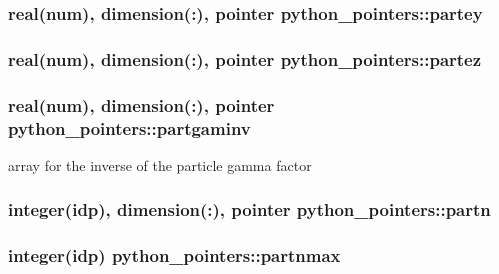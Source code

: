 \subsubsection[{\texorpdfstring{partey}{partey}}]{\setlength{\rightskip}{0pt plus 5cm}real(num), dimension(\+:), pointer python\+\_\+pointers\+::partey}\hypertarget{namespacepython__pointers_af358e4be4f10aeff30df94181589c382}{}\label{namespacepython__pointers_af358e4be4f10aeff30df94181589c382}
\subsubsection[{\texorpdfstring{partez}{partez}}]{\setlength{\rightskip}{0pt plus 5cm}real(num), dimension(\+:), pointer python\+\_\+pointers\+::partez}\hypertarget{namespacepython__pointers_a61f858897e873f37d7bb3e355e2b9740}{}\label{namespacepython__pointers_a61f858897e873f37d7bb3e355e2b9740}
\subsubsection[{\texorpdfstring{partgaminv}{partgaminv}}]{\setlength{\rightskip}{0pt plus 5cm}real(num), dimension(\+:), pointer python\+\_\+pointers\+::partgaminv}\hypertarget{namespacepython__pointers_a072266fc5f086ac68bdb72332b296a07}{}\label{namespacepython__pointers_a072266fc5f086ac68bdb72332b296a07}


array for the inverse of the particle gamma factor 

\subsubsection[{\texorpdfstring{partn}{partn}}]{\setlength{\rightskip}{0pt plus 5cm}integer(idp), dimension(\+:), pointer python\+\_\+pointers\+::partn}\hypertarget{namespacepython__pointers_a409a7bbbe4a92197cff88731aeb97fba}{}\label{namespacepython__pointers_a409a7bbbe4a92197cff88731aeb97fba}
\subsubsection[{\texorpdfstring{partnmax}{partnmax}}]{\setlength{\rightskip}{0pt plus 5cm}integer(idp) python\+\_\+pointers\+::partnmax}\hypertarget{namespacepython__pointers_a9e83842bc27e9a1d4021ea9c0ddd0320}{}\label{namespacepython__pointers_a9e83842bc27e9a1d4021ea9c0ddd0320}
